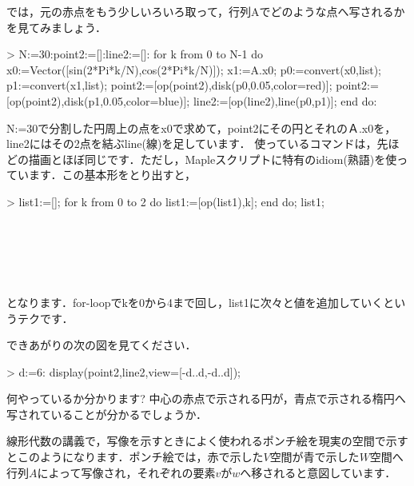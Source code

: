 では，元の赤点をもう少しいろいろ取って，行列Aでどのような点へ写されるかを見てみましょう．
\begin{MapleInput}
> N:=30:point2:=[]:line2:=[]: 
  for k from 0 to N-1 do
    x0:=Vector([sin(2*Pi*k/N),cos(2*Pi*k/N)]); 
    x1:=A.x0; 
    p0:=convert(x0,list);
    p1:=convert(x1,list); 
    point2:=[op(point2),disk(p0,0.05,color=red)];
    point2:=[op(point2),disk(p1,0.05,color=blue)]; 
    line2:=[op(line2),line(p0,p1)];
  end do:
\end{MapleInput}
N:=30で分割した円周上の点をx0で求めて，point2にその円とそれのＡ.x0を，line2にはその2点を結ぶline(線)を足しています．
使っているコマンドは，先ほどの描画とほぼ同じです．ただし，Mapleスクリプトに特有のidiom(熟語)を使っています．この基本形をとり出すと，
\begin{MapleInput}
> list1:=[]; 
  for k from 0 to 2 do 
    list1:=[op(list1),k]; 
  end do; 
  list1;
\end{MapleInput}
\begin{MapleOutputGather}
[] \notag \\
[0] \notag \\
[0, 1] \notag \\
[0, 1, 2] \notag \\
[0, 1, 2] \notag
\end{MapleOutputGather}
となります．for-loopでkを0から4まで回し，list1に次々と値を追加していくというテクです．

できあがりの次の図を見てください．
\begin{MapleInput}
> d:=6: display(point2,line2,view=[-d..d,-d..d]);
\end{MapleInput}

何やっているか分かります? 中心の赤点で示される円が，青点で示される楕円へ写されていることが分かるでしょうか．

線形代数の講義で，写像を示すときによく使われるポンチ絵を現実の空間で示すとこのようになります．ポンチ絵では，赤で示した$V$空間が青で示した$W$空間へ行列$A$によって写像され，それぞれの要素$v$が$w$へ移されると意図しています．
